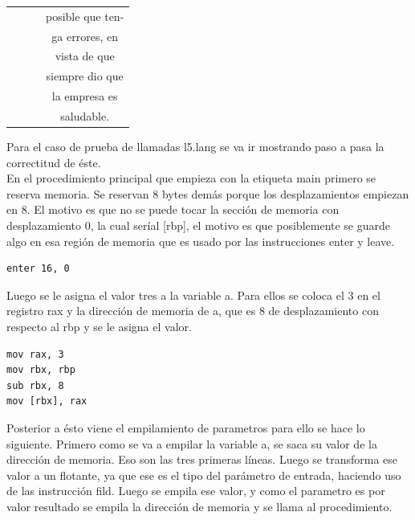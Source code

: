 \documentclass[11pt, spanish]{report}
\begin{document}
\begin{itemize}
\begin{table}[!hbp]
\begin{tabular}{c c c c}
                          &                        &                       & posible que ten- \\ [1ex] 
                          &                        &                       & ga errores, en   \\ [1ex] 
                          &                        &                       & vista de que     \\ [1ex] 
                          &                        &                       & siempre dio que  \\ [1ex] 
                          &                        &                       & la empresa es    \\ [1ex] 
                          &                        &                       & saludable.       \\ [1ex] 
      \hline
    \end{tabular}    
  \end{table}

\end{itemize}

Para el caso de prueba de llamadas l5.lang se va ir mostrando paso a pasa la correctitud de \'este.\\

En el procedimiento principal que empieza con la etiqueta main primero se reserva memoria. Se reservan 8 
bytes dem\'as porque los desplazamientos empiezan en 8. El motivo es que no se puede tocar la secci\'on 
de memoria con desplazamiento 0, la cual ser\'ial [rbp], el motivo es que posiblemente se guarde algo
en esa regi\'on de memoria que es usado por las instrucciones enter y leave.\\

\begin{verbatim}
enter 16, 0
\end{verbatim}

Luego se le asigna el valor tres a la variable a. Para ellos se coloca el 3 en el registro rax y la direcci\'on
de memoria de a, que es 8 de desplazamiento con respecto al rbp y se le asigna el valor.\\

\begin{verbatim}
mov rax, 3
mov rbx, rbp
sub rbx, 8
mov [rbx], rax
\end{verbatim}

Posterior a \'esto viene el empilamiento de parametros para ello se hace lo siguiente. Primero como
se va a empilar la variable a, se saca su valor de la direcci\'on de memoria. Eso son las tres
primeras l\'ineas. Luego se transforma ese valor a un flotante, ya que ese es el tipo del par\'ametro de entrada, haciendo uso de las instrucci\'on
fild. Luego se empila ese valor, y como el parametro es por valor resultado se empila la direcci\'on de memoria y se llama al procedimiento.\\
\end{document}
